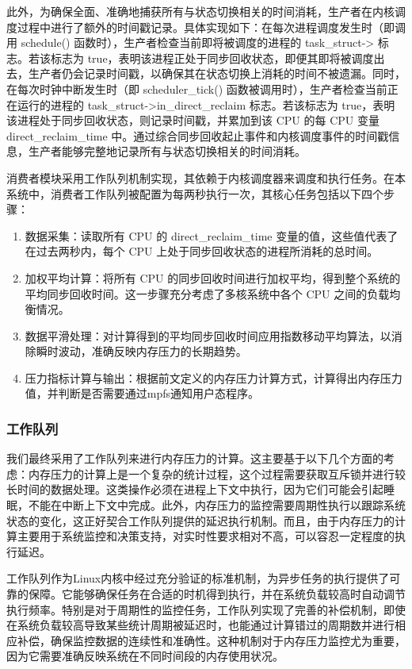 此外，为确保全面、准确地捕获所有与状态切换相关的时间消耗，生产者在内核调度过程中进行了额外的时间戳记录。具体实现如下：在每次进程调度发生时（即调用 schedule() 函数时），生产者检查当前即将被调度的进程的 task\_struct->  标志。若该标志为 true，表明该进程正处于同步回收状态，即便其即将被调度出去，生产者仍会记录时间戳，以确保其在状态切换上消耗的时间不被遗漏。同时，在每次时钟中断发生时（即 scheduler\_tick() 函数被调用时），生产者检查当前正在运行的进程的 task\_struct->in\_direct\_reclaim 标志。若该标志为 true，表明该进程处于同步回收状态，则记录时间戳，并累加到该 CPU 的每 CPU 变量 direct\_reclaim\_time 中。通过综合同步回收起止事件和内核调度事件的时间戳信息，生产者能够完整地记录所有与状态切换相关的时间消耗。

消费者模块采用工作队列机制实现，其依赖于内核调度器来调度和执行任务。在本系统中，消费者工作队列被配置为每两秒执行一次，其核心任务包括以下四个步骤：

\begin{enumerate}
    \item 数据采集：读取所有 CPU 的 direct\_reclaim\_time 变量的值，这些值代表了在过去两秒内，每个 CPU 上处于同步回收状态的进程所消耗的总时间。
    \item 加权平均计算：将所有 CPU 的同步回收时间进行加权平均，得到整个系统的平均同步回收时间。这一步骤充分考虑了多核系统中各个 CPU 之间的负载均衡情况。
    \item 数据平滑处理：对计算得到的平均同步回收时间应用指数移动平均算法，以消除瞬时波动，准确反映内存压力的长期趋势。
    \item 压力指标计算与输出：根据前文定义的内存压力计算方式，计算得出内存压力值，并判断是否需要通过mpfs通知用户态程序。
\end{enumerate}


\subsubsection{工作队列}
我们最终采用了工作队列来进行内存压力的计算。这主要基于以下几个方面的考虑：内存压力的计算上是一个复杂的统计过程，这个过程需要获取互斥锁并进行较长时间的数据处理。这类操作必须在进程上下文中执行，因为它们可能会引起睡眠，不能在中断上下文中完成。此外，内存压力的监控需要周期性执行以跟踪系统状态的变化，这正好契合工作队列提供的延迟执行机制。而且，由于内存压力的计算主要用于系统监控和决策支持，对实时性要求相对不高，可以容忍一定程度的执行延迟。

工作队列作为Linux内核中经过充分验证的标准机制，为异步任务的执行提供了可靠的保障。它能够确保任务在合适的时机得到执行，并在系统负载较高时自动调节执行频率。特别是对于周期性的监控任务，工作队列实现了完善的补偿机制，即使在系统负载较高导致某些统计周期被延迟时，也能通过计算错过的周期数并进行相应补偿，确保监控数据的连续性和准确性。这种机制对于内存压力监控尤为重要，因为它需要准确反映系统在不同时间段的内存使用状况。


